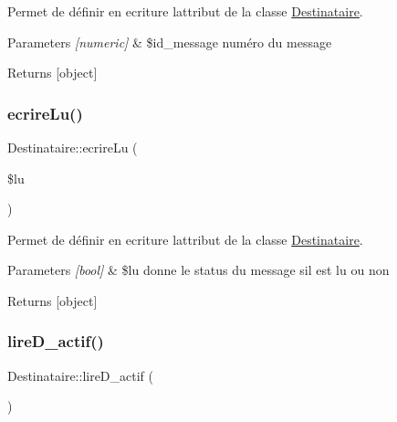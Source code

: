 Permet de définir en ecriture l\textquotesingle{}attribut de la classe \hyperlink{class_destinataire}{Destinataire}. 


\begin{DoxyParams}{Parameters}
{\em \mbox{[}numeric\mbox{]}} & \$id\+\_\+message numéro du message \\
\hline
\end{DoxyParams}
\begin{DoxyReturn}{Returns}
\mbox{[}object\mbox{]} 
\end{DoxyReturn}
\mbox{\label{class_destinataire_a72600f7fb8cbd8a993d4b4729784cd7c}} 
\subsubsection{\texorpdfstring{ecrire\+Lu()}{ecrireLu()}}
{\footnotesize\ttfamily Destinataire\+::ecrire\+Lu (\begin{DoxyParamCaption}\item[{}]{\$lu }\end{DoxyParamCaption})}



Permet de définir en ecriture l\textquotesingle{}attribut de la classe \hyperlink{class_destinataire}{Destinataire}. 


\begin{DoxyParams}{Parameters}
{\em \mbox{[}bool\mbox{]}} & \$lu donne le status du message s\textquotesingle{}il est lu ou non \\
\hline
\end{DoxyParams}
\begin{DoxyReturn}{Returns}
\mbox{[}object\mbox{]} 
\end{DoxyReturn}
\mbox{\label{class_destinataire_a560a64eedd2e2cd7fac6cfe704a1a83c}} 
\subsubsection{\texorpdfstring{lire\+D\+\_\+actif()}{lireD\_actif()}}
{\footnotesize\ttfamily Destinataire\+::lire\+D\+\_\+actif (\begin{DoxyParamCaption}{ }\end{DoxyParamCaption})}



